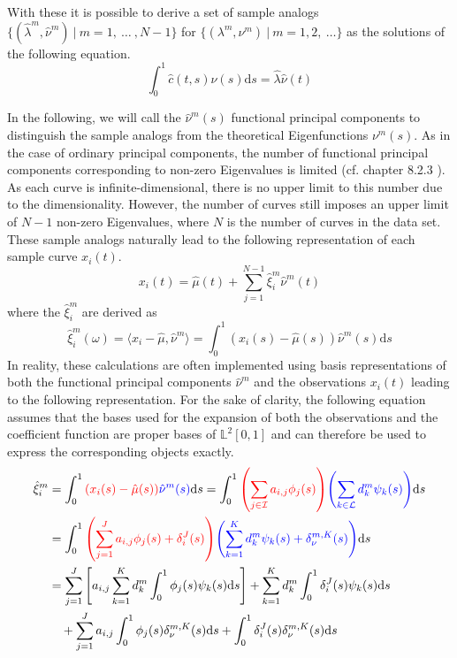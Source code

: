 \documentclass[11pt,twoside,a4paper]{article}
\begin{document}
	With these it is possible to derive a set of sample analogs $\{(\hat{\lambda}^m, \hat{\nu}^m) \: \vert \: m = 1,\: \dots\:, N-1\}$ for $\{(\lambda^m, \nu^m) \: \vert \: m = 1, 2, \:\dots\}$ as the solutions of the following equation. 
	\begin{equation}
		\int_{0}^{1}\hat{c}(t,s)\hat{\nu}(s) \mathrm{d}s = \hat{\lambda} \hat{\nu}(t)
	\end{equation}

	In the following, we will call the $\hat{\nu}^m(s)$ functional principal components to distinguish the sample analogs from the theoretical Eigenfunctions $\nu^m(s)$. As in the case of ordinary principal components, the number of functional principal components corresponding to non-zero Eigenvalues is limited (cf. chapter 8.2.3 \cite{ramsay_functional_2005}). As each curve is infinite-dimensional, there is no upper limit to this number due to the dimensionality. However, the number of curves still imposes an upper limit of $N-1$ non-zero Eigenvalues, where $N$ is the number of curves in the data set.
	These sample analogs naturally lead to the following representation of each sample curve $x_i(t)$.
	\begin{equation}
		x_i(t) = \hat{\mu}(t) + \sum_{j = 1}^{N-1} \hat{\xi}_{i}^{m} \hat{\nu}^{m}(t)
	\end{equation}
	where the $\hat{\xi}_{i}^m$ are derived as 
	\begin{equation}
		\hat{\xi}_i^m(\omega) = \langle x_i - \hat{\mu}, \hat{\nu}^m\rangle = \int_{0}^{1} \left(x_i(s) - \hat{\mu}(s)\right) \hat{\nu}^m(s) \mathrm{d}s
	\end{equation}
	In reality, these calculations are often implemented using basis representations of both the functional principal components $\hat{\nu}^m$ and the observations $x_i(t)$ leading to the following representation. For the sake of clarity, the following equation assumes that the bases used for the expansion of both the observations and the coefficient function are proper bases of $\mathbb{L}^2[0,1]$ and can therefore be used to express the corresponding objects exactly.
	\begin{equation}\label{FPCA_basis_expansion}
		\begin{split}
			\hat{\xi}_{i}^m & = \int_{0}^{1} {\color{red}\left( x_i(s) - \hat{\mu}(s)\right)} {\color{blue}\hat{\nu}^m(s)} \mathrm{d}s
			= \int_{0}^{1} {\color{red}\left(\sum_{j \in \mathcal{I}} a_{i,j} \phi_j(s)\right)} {\color{blue}\left(\sum_{k \in \mathcal{L}} d_{k}^m \psi_{k}(s)\right)} \mathrm{d}s \\
			& = \int_{0}^{1} {\color{red}\left(\sum_{j = 1}^{J} a_{i,j} \phi_j(s) + \delta_i^J(s)\right)} {\color{blue}\left(\sum_{k = 1}^{K} d_{k}^m \psi_{k}(s) + \delta_{\nu}^{m,K}(s)\right)} \mathrm{d}s \\
			& = \sum_{j = 1}^{J} \left[a_{i,j}\sum_{k = 1}^{K} d_{k}^m \int_{0}^{1} \phi_j(s) \psi_{k}(s)\mathrm{d}s \right] +  \sum_{k = 1}^{K} d_{k}^m \int_{0}^{1} \delta_i^J(s) \psi_{k}(s) \mathrm{d}s \\
			& \quad + \sum_{j = 1}^{J} a_{i,j} \int_{0}^{1}\phi_j(s) \delta_{\nu}^{m,K}(s) \mathrm{d}s + \int_{0}^{1} \delta_i^J(s) \delta_{\nu}^{m,K}(s) \mathrm{d}s
		\end{split}
	\end{equation}
\end{document}

